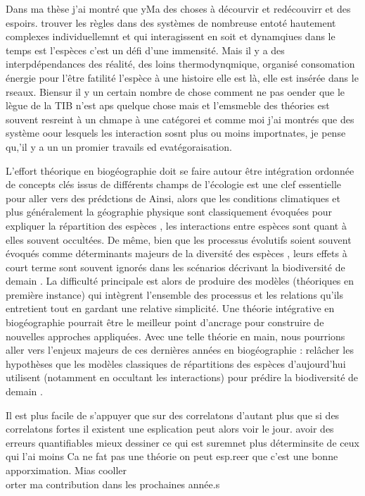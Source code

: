 Dans ma thèse j'ai montré que yMa des choses à décourvir et redécouvirr
et des espoirs. trouver les règles dans des systèmes de nombreuse entoté
hautement complexes individuellemnt et qui interagissent en soit et
dynamqiues dans le temps est l'espèces c'est un défi d'une immensité.
Mais il y a des interpdépendances des réalité, des loins
thermodynqmique, organisé consomation énergie pour l'être fatilité
l'espèce à une histoire elle est là, elle est insérée dans le rseaux.
Biensur il y un certain nombre de chose comment ne pas oender que le
lègue de la TIB n'est aps quelque chose mais et l'emsmeble des théories
est souvent resreint à un chmape à une catégorei et comme moi j'ai
montrés que des système oour lesquels les interaction sosnt plus ou
moins importnates, je pense qu,'il y a un un promier travails ed
evatégoraisation.

L'effort théorique en biogéographie doit se faire autour être
intégration ordonnée de concepts clés issus de différents champs de
l'écologie \citep{Thuiller2013} est une clef essentielle pour aller vers
des prédctions de Ainsi, alors que les conditions climatiques et plus
généralement la géographie physique sont classiquement évoquées pour
expliquer la répartition des espèces \cite{Kearney2004}, les
interactions entre espèces sont quant à elles souvent occultées. De
même, bien que les processus évolutifs soient souvent évoqués comme
déterminants majeurs de la diversité des espèces \cite{Rosindell2011},
leurs effets à court terme sont souvent ignorés \cite{Parmesan2006} dans
les scénarios décrivant la biodiversité de demain \cite{Lavergne2010}.
La difficulté principale est alors de produire des modèles (théoriques
en première instance) qui intègrent l'ensemble des processus et les
relations qu'ils entretient \cite{Thuiller2013} tout en gardant une
relative simplicité. Une théorie intégrative en biogéographie pourrait
être le meilleur point d'ancrage pour construire de nouvelles approches
appliquées. Avec une telle théorie en main, nous pourrions aller vers
l'enjeux majeurs de ces dernières années en biogéographie : relâcher les
hypothèses que les modèles classiques de répartitions des espèces
d'aujourd'hui utilisent (notamment en occultant les interactions) pour
prédire la biodiversité de demain \cite{Guisan2011}.

Il est plus facile de s'appuyer que sur des correlatons d'autant plus
que si des correlatons fortes il existent une esplication peut alors
voir le jour. avoir des erreurs quantifiables mieux dessiner ce qui est
suremnet plus déterminsite de ceux qui l'ai moins Ca ne fat pas une
théorie on peut esp.reer que c'est une bonne apporximation. Mias
cooller\\
orter ma contribution dans les prochaines année.s

